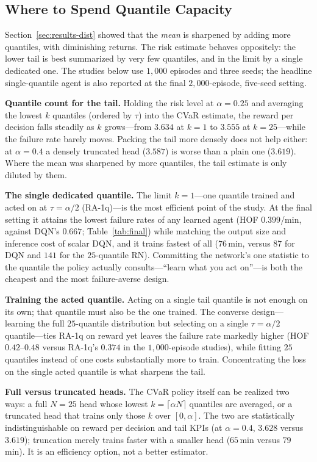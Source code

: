\documentclass[conference]{IEEEtran}
\begin{document}
\subsection{Where to Spend Quantile Capacity}
\label{sec:results-bridge}
Section~\ref{sec:results-dist} showed that the \emph{mean} is sharpened by adding
more quantiles, with diminishing returns. The risk estimate behaves oppositely: the lower
tail is best summarized by very few quantiles, and in the limit by a single
dedicated one. The studies below use $1{,}000$ episodes and three seeds; the
headline single-quantile agent is also reported at the final
$2{,}000$-episode, five-seed setting.

\textbf{Quantile count for the tail.} Holding the risk level at $\alpha=0.25$ and
averaging the lowest $k$ quantiles (ordered by $\tau$) into the CVaR estimate, the reward per decision
falls steadily as $k$ grows---from $3.634$ at $k=1$ to $3.555$ at $k=25$---while
the failure rate barely moves. Packing the tail more densely does not help either:
at $\alpha=0.4$ a densely truncated head ($3.587$) is worse than a plain one
($3.619$). Where the mean was sharpened by more quantiles, the tail estimate is
only diluted by them.

\textbf{The single dedicated quantile.} The limit $k=1$---one quantile trained and
acted on at $\tau=\alpha/2$ (RA-1q)---is the most efficient point of the study. At
the final setting it attains the lowest failure rates of any learned agent
(HOF $0.399$/min, against DQN's $0.667$; Table~\ref{tab:final}) while matching the
output size and inference cost of scalar DQN, and it trains fastest of all
($76$\,min, versus $87$ for DQN and $141$ for the $25$-quantile RN). Committing the
network's one statistic to the quantile the policy actually consults---``learn what
you act on''---is both the cheapest and the most failure-averse design.

\textbf{Training the acted quantile.} Acting on a single tail quantile is not
enough on its own; that quantile must also be the one trained. The converse
design---learning the full $25$-quantile distribution but selecting on a single
$\tau=\alpha/2$ quantile---ties RA-1q on reward yet leaves the failure rate
markedly higher (HOF $0.42$--$0.48$ versus RA-1q's $0.374$ in the $1{,}000$-episode studies), while
fitting $25$ quantiles instead of one costs substantially more to train.
Concentrating the loss on the single acted quantile is what sharpens the tail.

\textbf{Full versus truncated heads.}\label{sec:results-trunc} The CVaR policy
itself can be realized two ways: a full $N=25$ head whose lowest
$k=\lceil\alpha N\rceil$ quantiles are averaged, or a truncated head that trains
only those $k$ over $[0,\alpha]$. The two are statistically indistinguishable on
reward per decision and tail KPIs (at $\alpha=0.4$, $3.628$ versus $3.619$);
truncation merely trains faster with a smaller head ($65$\,min versus $79$\,min). It is
an efficiency option, not a better estimator.
\end{document}
